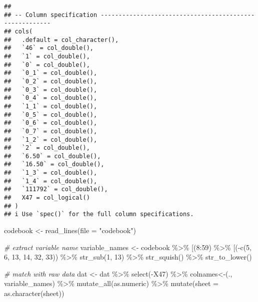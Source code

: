 \documentclass[
]{article}
\newenvironment{Shaded}{\begin{snugshade}}{\end{snugshade}}
\newcommand{\AttributeTok}[1]{\textcolor[rgb]{0.77,0.63,0.00}{#1}}
\newcommand{\CommentTok}[1]{\textcolor[rgb]{0.56,0.35,0.01}{\textit{#1}}}
\newcommand{\DecValTok}[1]{\textcolor[rgb]{0.00,0.00,0.81}{#1}}
\newcommand{\FunctionTok}[1]{\textcolor[rgb]{0.00,0.00,0.00}{#1}}
\newcommand{\NormalTok}[1]{#1}
\newcommand{\OtherTok}[1]{\textcolor[rgb]{0.56,0.35,0.01}{#1}}
\newcommand{\SpecialCharTok}[1]{\textcolor[rgb]{0.00,0.00,0.00}{#1}}
\newcommand{\StringTok}[1]{\textcolor[rgb]{0.31,0.60,0.02}{#1}}
\begin{document}
\begin{verbatim}
## 
## -- Column specification --------------------------------------------------------
## cols(
##   .default = col_character(),
##   `46` = col_double(),
##   `1` = col_double(),
##   `0` = col_double(),
##   `0_1` = col_double(),
##   `0_2` = col_double(),
##   `0_3` = col_double(),
##   `0_4` = col_double(),
##   `1_1` = col_double(),
##   `0_5` = col_double(),
##   `0_6` = col_double(),
##   `0_7` = col_double(),
##   `1_2` = col_double(),
##   `2` = col_double(),
##   `6.50` = col_double(),
##   `16.50` = col_double(),
##   `1_3` = col_double(),
##   `1_4` = col_double(),
##   `111792` = col_double(),
##   X47 = col_logical()
## )
## i Use `spec()` for the full column specifications.
\end{verbatim}

\begin{Shaded}
\begin{Highlighting}[]
\NormalTok{codebook }\OtherTok{\textless{}{-}} \FunctionTok{read\_lines}\NormalTok{(}\AttributeTok{file =} \StringTok{"codebook"}\NormalTok{)}

\CommentTok{\# extract variable name}
\NormalTok{variable\_names }\OtherTok{\textless{}{-}}\NormalTok{ codebook }\SpecialCharTok{\%\textgreater{}\%}
  \StringTok{\textasciigrave{}}\AttributeTok{[}\StringTok{\textasciigrave{}}\NormalTok{(}\DecValTok{8}\SpecialCharTok{:}\DecValTok{59}\NormalTok{) }\SpecialCharTok{\%\textgreater{}\%}
  \StringTok{\textasciigrave{}}\AttributeTok{[}\StringTok{\textasciigrave{}}\NormalTok{(}\SpecialCharTok{{-}}\FunctionTok{c}\NormalTok{(}\DecValTok{5}\NormalTok{, }\DecValTok{6}\NormalTok{, }\DecValTok{13}\NormalTok{, }\DecValTok{14}\NormalTok{, }\DecValTok{32}\NormalTok{, }\DecValTok{33}\NormalTok{)) }\SpecialCharTok{\%\textgreater{}\%}
  \FunctionTok{str\_sub}\NormalTok{(}\DecValTok{1}\NormalTok{, }\DecValTok{13}\NormalTok{) }\SpecialCharTok{\%\textgreater{}\%}
  \FunctionTok{str\_squish}\NormalTok{() }\SpecialCharTok{\%\textgreater{}\%}
  \FunctionTok{str\_to\_lower}\NormalTok{()}


\CommentTok{\# match with raw data}
\NormalTok{dat }\OtherTok{\textless{}{-}}\NormalTok{ dat }\SpecialCharTok{\%\textgreater{}\%}
  \FunctionTok{select}\NormalTok{(}\SpecialCharTok{{-}}\NormalTok{X47) }\SpecialCharTok{\%\textgreater{}\%}
  \StringTok{\textasciigrave{}}\AttributeTok{colnames\textless{}{-}}\StringTok{\textasciigrave{}}\NormalTok{(., variable\_names) }\SpecialCharTok{\%\textgreater{}\%}
  \FunctionTok{mutate\_all}\NormalTok{(as.numeric) }\SpecialCharTok{\%\textgreater{}\%}
  \FunctionTok{mutate}\NormalTok{(}\AttributeTok{sheet =} \FunctionTok{as.character}\NormalTok{(sheet))}



\end{Highlighting}
\end{Shaded}
\end{document}
